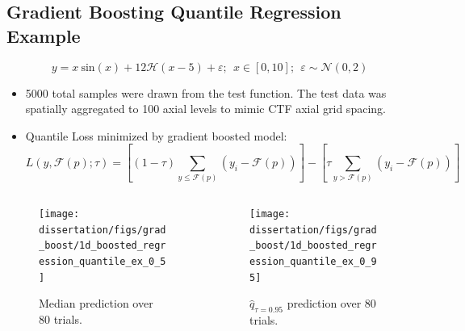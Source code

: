 \documentclass[t, pdftex]{beamer}
\begin{document}
\subsection*{Gradient Boosting Quantile Regression Example}
\begin{frame}
\vspace{-18pt}
    \[
    y = x\ \mathrm{sin}(x) +12 \mathcal H(x-5)+\varepsilon; \ \ x\in [0,10]; \ \ \varepsilon \sim \mathcal N(0,2)
    \]
    \vspace{-10pt}
\scriptsize{
\begin{itemize}
    \item 5000 total samples were drawn from the test function.  The test data was spatially aggregated to 100 axial levels to mimic CTF axial grid spacing.
    \item Quantile Loss minimized by gradient boosted model:
    \vspace{-4pt}
    \[
    L(y, \mathcal F(p);\tau) = \left[ (1-\tau) \sum_{y \leq \mathcal F(p)}( y_i - \mathcal F(p) ) \right] - \left[ \tau \sum_{y > \mathcal F(p)} (y_i - \mathcal F(p)) \right]
    \]
\end{itemize}   
}
\vspace{-26pt}
\begin{columns}
    \begin{column}{0.5\textwidth}
        \begin{figure}
            \centering
            \texttt{[image: dissertation/figs/grad\_boost/1d\_boosted\_regression\_quantile\_ex\_0\_5]}
            \caption{\centering \scriptsize Median prediction over 80 trials.}
        \end{figure}
    \end{column}
    \begin{column}{0.5\textwidth}  %
        \begin{figure}
            \centering
            \texttt{[image: dissertation/figs/grad\_boost/1d\_boosted\_regression\_quantile\_ex\_0\_95]}
            \caption{\centering \scriptsize $\hat{q}_{\tau=0.95}$ prediction over 80 trials.}
        \end{figure}
    \end{column}
\end{columns}
\end{frame}
\end{document}
